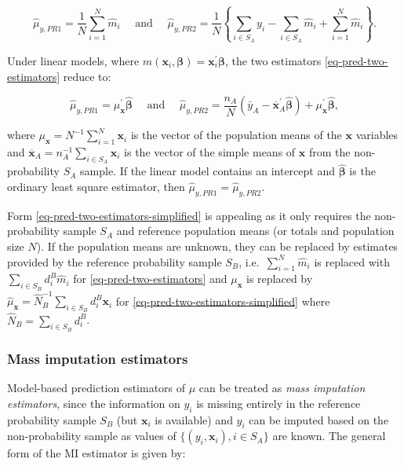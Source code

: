 \documentclass[
]{jss}
\begin{document}
\begin{equation}
\hat{\mu}_{y,PR1}=\frac{1}{N} \sum_{i=1}^N \hat{m}_i \quad \text { and } \quad \hat{\mu}_{y,PR2}=\frac{1}{N}\left\{\sum_{i \in S_A} y_i-\sum_{i \in S_A} \hat{m}_i+\sum_{i=1}^N \hat{m}_i\right\}.
\label{eq-pred-two-estimators}
\end{equation}

Under linear models, where
\(m(\boldsymbol{x}_i, \boldsymbol{\beta})=\boldsymbol{x}_i^{\prime}\boldsymbol{\beta}\),
the two estimators \eqref{eq-pred-two-estimators} reduce to:

\begin{equation}
\hat{\mu}_{y,PR1}=\mu_{\boldsymbol{x}}^{\prime} \hat{\boldsymbol{\beta}} \quad \text { and } \quad \hat{\mu}_{y,PR2}=\frac{n_A}{N}\left(\bar{y}_A-\overline{\boldsymbol{x}}_A^{\prime} \hat{\boldsymbol{\beta}}\right)+\mu_{\boldsymbol{x}}^{\prime} \hat{\boldsymbol{\beta}},
\label{eq-pred-two-estimators-simplified}
\end{equation}

where \(\mu_{\boldsymbol{x}} = N^{-1}\sum_{i=1}^N\boldsymbol{x}_i\) is
the vector of the population means of the \(\boldsymbol{x}\) variables
and
\(\overline{\boldsymbol{x}}_A=n_A^{-1}\sum_{i \in S_A}\boldsymbol{x}_i\)
is the vector of the simple means of \(\boldsymbol{x}\) from the
non-probability \(S_A\) sample. If the linear model contains an
intercept and \(\hat{\boldsymbol{\beta}}\) is the ordinary least square
estimator, then \(\hat{\mu}_{y,PR1}=\hat{\mu}_{y,PR2}\).

Form \eqref{eq-pred-two-estimators-simplified} is appealing as it only
requires the non-probability sample \(S_A\) and reference population
means (or totals and population size \(N\)). If the population means are
unknown, they can be replaced by estimates provided by the reference
probability sample \(S_B\), i.e.~\(\sum_{i=1}^N \hat{m}_i\) is replaced
with \(\sum_{i \in S_B} d_i^B\hat{m}_i\) for
\eqref{eq-pred-two-estimators} and \(\mu_{\boldsymbol{x}}\) is replaced
by
\(\hat{\mu}_{\boldsymbol{x}}=\hat{N}_B^{-1}\sum_{i \in S_B}d_i^B\boldsymbol{x}_i\)
for \eqref{eq-pred-two-estimators-simplified} where
\(\hat{N}_B=\sum_{i \in S_B}d_i^B\).

\subsubsection{Mass imputation
estimators}\label{mass-imputation-estimators}

Model-based prediction estimators of \(\mu\) can be treated as
\textit{mass imputation estimators}, since the information on \(y_i\) is
missing entirely in the reference probability sample \(S_B\) (but
\(\boldsymbol{x}_i\) is available) and \(y_i\) can be imputed based on
the non-probability sample as values of
\(\{ (y_i, \boldsymbol{x}_i), i \in S_A\}\) are known. The general form
of the MI estimator is given by:
\end{document}
